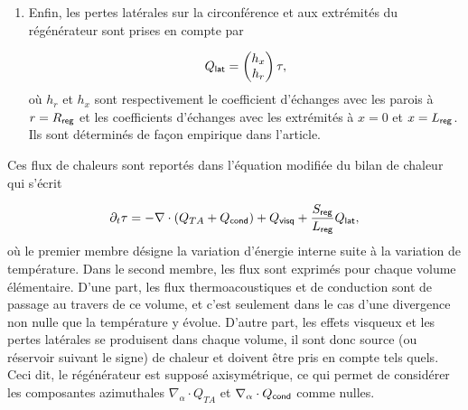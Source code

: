 \begin{enumerate}[label=\textbf{(\roman*)}]
\item Enfin, les pertes latérales sur la circonférence et aux extrémités du régénérateur sont prises en compte par

\begin{equation}
Q_{\sf lat} = \begin{pmatrix}h_x\\h_r\end{pmatrix} \tau,
\label{eq:FluxLat_Lotton}
\end{equation}
où $h_r$ et $h_x$ sont respectivement le coefficient d'échanges avec les parois à $r = R_{\sf reg}$ et les coefficients d'échanges avec les extrémités à $x=0$ et $x=L_{\sf reg}$. Ils sont déterminés de façon empirique dans l'article.

%
%

\end{enumerate} 

Ces flux de chaleurs sont reportés dans l'équation modifiée du bilan de chaleur qui s'écrit

\begin{equation}
[\Phi\rho_0 C_p + (1-\Phi)\rho_s C_s]\partial_t \tau = - \nabla \cdot (Q_{TA} + Q_{\sf cond}) + Q_{\sf visq} + \frac{S_{\sf reg}}{L_{\sf reg}}Q_{\sf lat},
\label{eq:BilanChaleur_LottonPoignand}
\end{equation}
où le premier membre désigne la variation d'énergie interne suite à la variation de température. Dans le second membre, les flux sont exprimés pour chaque volume élémentaire. D'une part, les flux thermoacoustiques et de conduction sont \og de passage \fg{} au travers de ce volume, et c'est seulement dans le cas d'une divergence non nulle que la température y évolue. D'autre part, les effets visqueux et les pertes latérales se produisent dans chaque volume, il sont donc source (ou réservoir suivant le signe) de chaleur et doivent être pris en compte tels quels. Ceci dit, le régénérateur est supposé axisymétrique, ce qui permet de considérer les composantes azimuthales $\nabla_\alpha \cdot Q_{TA}$ et $\nabla_\alpha \cdot Q_{\sf cond}$ comme nulles.


